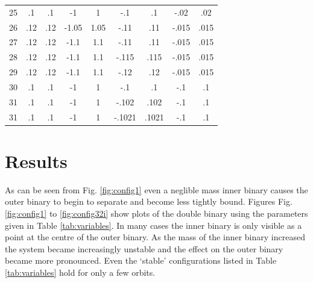 \documentclass[a4paper,12pt]{article}
\begin{document}
\begin{table}[ht!]
\begin{tabular}{ccccccccc}
   25 & .1 & .1 & -1 & 1 & -.1 & .1 & -.02 & .02\\
   26 & .12 & .12 & -1.05 & 1.05 & -.11 & .11 & -.015 & .015\\
   27 & .12 & .12 & -1.1 & 1.1 & -.11 & .11 & -.015 & .015\\
   28 & .12 & .12 & -1.1 & 1.1 & -.115 & .115 & -.015 & .015\\
   29 & .12 & .12 & -1.1 & 1.1 & -.12 & .12 & -.015 & .015\\
   30 & .1 & .1 & -1 & 1 & -.1 & .1 & -.1 & .1\\
   31 & .1 & .1 & -1 & 1 & -.102 & .102 & -.1 & .1\\
   31 & .1 & .1 & -1 & 1 & -.1021 & .1021 & -.1 & .1\\
  \end{tabular}
\end{table}

\newpage
\section{Results}
As can be seen from Fig. \ref{fig:config1} even a neglible mass inner binary causes the outer binary to begin to separate and become less tightly bound.
Figures Fig. \ref{fig:config1} to \ref{fig:config32i} show plots of the double binary using the parameters given in Table \ref{tab:variables}.
In many cases the inner binary is only visible as a point at the centre of the outer binary.
As the mass of the inner binary increased the system became increasingly unstable and the effect on the outer binary became more pronounced.
Even the `stable' configurations listed in Table \ref{tab:variables} hold for only a few orbits.
\end{document}
